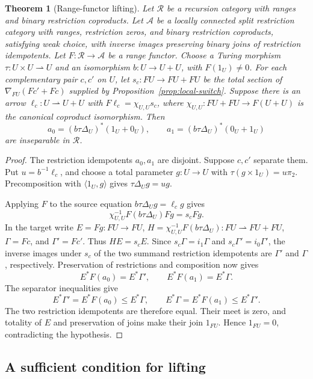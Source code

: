 \documentclass[11pt]{article}
\newtheorem{theorem}{Theorem}[section]
\begin{document}
\begin{theorem}[Range-functor lifting]\label{thm:local-lifting}
Let $\mathscr R$ be a recursion category with ranges and
binary restriction coproducts. Let $\mathcal A$ be a locally connected
split restriction category with ranges, restriction zeros, and binary
restriction coproducts, satisfying weak choice, with inverse images
preserving binary joins of restriction idempotents. Let
$F:\mathscr R\to\mathcal A$ be a range functor.
Choose a Turing morphism $\tau:U\times U\rightharpoonup U$ and
an isomorphism $b:U\to U+U$, with $F(1_U)\ne0$.
For each complementary pair $c,c'$ on $U$, let
$s_c:FU\to FU+FU$ be the total section of $\nabla_{FU}(Fc'+Fc)$ supplied by
Proposition~\ref{prop:local-switch}. Suppose there is an arrow
$\ell_c:U\rightharpoonup U+U$ with
$F\ell_c=\chi_{U,U}s_c$, where
$\chi_{U,U}:FU+FU\to F(U+U)$ is the canonical coproduct isomorphism.
Then
\[
 a_0=(b\tau\Delta_U)^*(1_U+0_U),\qquad
 a_1=(b\tau\Delta_U)^*(0_U+1_U)
\]
are inseparable in $\mathscr R$.
\end{theorem}
\begin{proof}
The restriction idempotents $a_0,a_1$ are disjoint. Suppose $c,c'$ separate them.
Put $u=b^{-1}\ell_c$, and choose a total parameter $g:U\to U$ with
$\tau(g\times1_U)=u\pi_2$. Precomposition with $\langle1_U,g\rangle$
gives $\tau\Delta_Ug=ug$.

Applying $F$ to the source equation
$b\tau\Delta_Ug=\ell_cg$ gives
\[
 \chi_{U,U}^{-1}F(b\tau\Delta_U)Fg=s_cFg.
\]
In the target write $E=Fg:FU\to FU$,
$H=\chi_{U,U}^{-1}F(b\tau\Delta_U):FU\rightharpoonup FU+FU$,
$\Gamma=Fc$, and $\Gamma'=Fc'$. Thus $HE=s_cE$.
Since $s_c\Gamma=i_1\Gamma$ and $s_c\Gamma'=i_0\Gamma'$,
the inverse images under $s_c$ of the two summand restriction idempotents are
$\Gamma'$ and $\Gamma$,
respectively. Preservation of restrictions and composition now gives
\[
 E^*F(a_0)=E^*\Gamma',\qquad E^*F(a_1)=E^*\Gamma.
\]
The separator inequalities give
\[
 E^*\Gamma'=E^*F(a_0)\le E^*\Gamma,
 \qquad E^*\Gamma=E^*F(a_1)\le E^*\Gamma'.
\]
The two restriction idempotents are therefore equal. Their meet is
zero, and totality of $E$ and preservation of joins make their join
$1_{FU}$. Hence $1_{FU}=0$, contradicting the hypothesis.
\end{proof}

\subsection{A sufficient condition for lifting}
\end{document}
